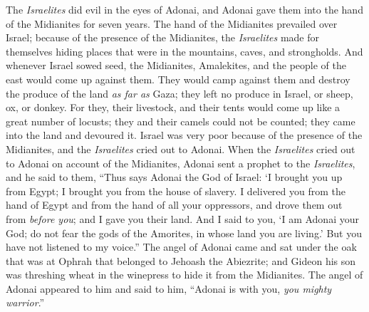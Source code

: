 \begin{biblechapter} %
 The \textit{Israelites} did evil in the eyes of Adonai, and Adonai gave them into the hand of the Midianites for seven years.
\verse The hand of the Midianites prevailed over Israel; because of the presence of the Midianites, the \textit{Israelites} made for themselves hiding places that were in the mountains, caves, and strongholds.
\verse And whenever Israel sowed seed, the Midianites, Amalekites, and the people of the east would come up against them.
\verse They would camp against them and destroy the produce of the land \textit{as far as} Gaza; they left no produce in Israel, or sheep, ox, or donkey.
\verse For they, their livestock, and their tents would come up like a great number of locusts; they and their camels could not be counted; they came into the land and devoured it.
\verse Israel was very poor because of the presence of the Midianites, and the \textit{Israelites} cried out to Adonai.
\verse When the \textit{Israelites} cried out to Adonai on account of the Midianites,
\verse Adonai sent a prophet to the \textit{Israelites}, and he said to them, “Thus says Adonai the God of Israel: ‘I brought you up from Egypt; I brought you from the house of slavery.
\verse I delivered you from the hand of Egypt and from the hand of all your oppressors, and drove them out from \textit{before you}; and I gave you their land.
\verse And I said to you, ‘I am Adonai your God; do not fear the gods of the Amorites, in whose land you are living.’ But you have not listened to my voice.”
 The angel of Adonai came and sat under the oak that was at Ophrah that belonged to Jehoash the Abiezrite; and Gideon his son was threshing wheat in the winepress to hide it from the Midianites.
\verse The angel of Adonai appeared to him and said to him, “Adonai is with you, \textit{you mighty warrior}.”

\end{biblechapter}
